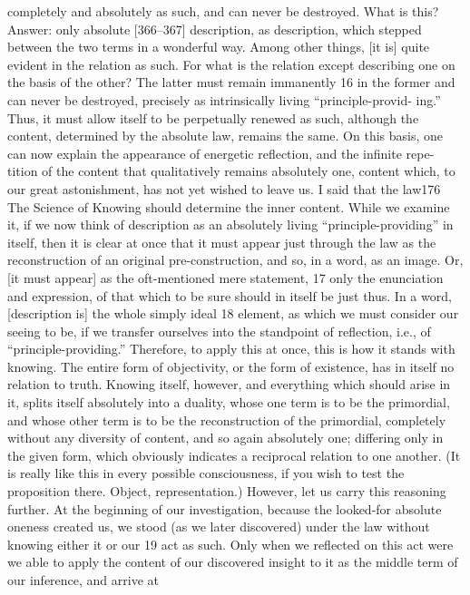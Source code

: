 completely and absolutely as such, and can never be destroyed. What is this?
Answer: only absolute [366–367] description, as description, which stepped
between the two terms in a wonderful way. Among other things, [it is] quite
evident in the relation as such. For what is the relation except describing one
on the basis of the other? The latter must remain immanently 16 in the former
and can never be destroyed, precisely as intrinsically living “principle-provid-
ing.” Thus, it must allow itself to be perpetually renewed as such, although the
content, determined by the absolute law, remains the same. On this basis, one
can now explain the appearance of energetic reflection, and the infinite repe-
tition of the content that qualitatively remains absolutely one, content which,
to our great astonishment, has not yet wished to leave us. I said that the law176
The Science of Knowing
should determine the inner content. While we examine it, if we now think of
description as an absolutely living “principle-providing” in itself, then it is
clear at once that it must appear just through the law as the reconstruction of
an original pre-construction, and so, in a word, as an image. Or, [it must
appear] as the oft-mentioned mere statement, 17 only the enunciation and
expression, of that which to be sure should in itself be just thus. In a word,
[description is] the whole simply ideal 18 element, as which we must consider
our seeing to be, if we transfer ourselves into the standpoint of reflection, i.e.,
of “principle-providing.”
Therefore, to apply this at once, this is how it stands with knowing. The
entire form of objectivity, or the form of existence, has in itself no relation to
truth. Knowing itself, however, and everything which should arise in it, splits
itself absolutely into a duality, whose one term is to be the primordial, and
whose other term is to be the reconstruction of the primordial, completely
without any diversity of content, and so again absolutely one; differing only in
the given form, which obviously indicates a reciprocal relation to one another.
(It is really like this in every possible consciousness, if you wish to test the
proposition there. Object, representation.)
However, let us carry this reasoning further. At the beginning of our
investigation, because the looked-for absolute oneness created us, we stood (as
we later discovered) under the law without knowing either it or our 19 act as
such. Only when we reflected on this act were we able to apply the content of
our discovered insight to it as the middle term of our inference, and arrive at
